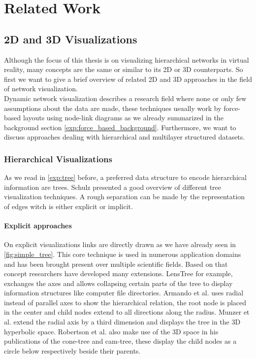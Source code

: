 \chapter{Related Work}

\section{2D and 3D Visualizations}

Although the focus of this thesis is on visualizing hierarchical networks in virtual reality, many concepts are the same or similar to its 2D or 3D counterparts. So first we want to give a brief overview of related 2D and 3D approaches in the field of network visualization.\\
Dynamic network visualization describes a research field where none or only few assumptions about the data are made, these techniques usually work by force-based layouts using node-link diagrams as we already summarized in the background section \ref{exp:force_based_background}. Furthermore, we want to discuss approaches dealing with hierarchical and multilayer structured datasets.

\subsection{Hierarchical Visualizations}

As we read in \ref{exp:tree} before, a preferred data structure to encode hierarchical information are trees.
Schulz \cite{schulz_treevisnet_2011} presented a good overview of different tree visualization techniques. A rough separation can be made by the representation of edges witch is either explicit or implicit. 

\subsubsection{Explicit approaches}
On explicit visualizations links are directly drawn as we have already seen in \ref{fig:simple_tree}. This core technique is used in numerous application domains and has been brought present over multiple scientific fields. Based on that concept researchers have developed many extensions.
LensTree \cite{song_lenstree_2006} for example, exchanges the axes and allows collapsing certain parts of the tree to display information structures like computer file directories. 
Armando et al. \cite{arce-orozco_radial_2017} uses radial instead of parallel axes to show the hierarchical relation, the root node is placed in the center and child nodes extend to all directions along the radius.
Munzer et al. \cite{munzner_h3_1997} extend the radial axis by a third dimension and displays the tree in the 3D hyperbolic space.
Robertson et al. \cite{robertson_cone_1991} also make use of the 3D space in his publications of the cone-tree and cam-tree, these display the child nodes as a circle below respectively beside their parents.  

